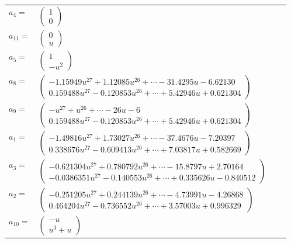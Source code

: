 \documentclass[1p]{elsarticle_modified}
\theoremstyle{definition}
\begin{document}
\begin{tabular}{m{7pt} m{180pt} m{7pt} m{180pt} }
\flushright $a_{4}=$&$\begin{pmatrix}1\\0\end{pmatrix}$ \\
\flushright $a_{11}=$&$\begin{pmatrix}0\\u\end{pmatrix}$ \\
\flushright $a_{5}=$&$\begin{pmatrix}1\\- u^2\end{pmatrix}$ \\
\flushright $a_{8}=$&$\begin{pmatrix}-1.15949 u^{27}+1.12085 u^{26}+\cdots-31.4295 u-6.62130\\0.159488 u^{27}-0.120853 u^{26}+\cdots+5.42946 u+0.621304\end{pmatrix}$ \\
\flushright $a_{9}=$&$\begin{pmatrix}- u^{27}+u^{26}+\cdots-26 u-6\\0.159488 u^{27}-0.120853 u^{26}+\cdots+5.42946 u+0.621304\end{pmatrix}$ \\
\flushright $a_{1}=$&$\begin{pmatrix}-1.49816 u^{27}+1.73027 u^{26}+\cdots-37.4676 u-7.20397\\0.338676 u^{27}-0.609413 u^{26}+\cdots+7.03817 u+0.582669\end{pmatrix}$ \\
\flushright $a_{3}=$&$\begin{pmatrix}-0.621304 u^{27}+0.780792 u^{26}+\cdots-15.8797 u+2.70164\\-0.0386351 u^{27}-0.140553 u^{26}+\cdots+0.335626 u-0.840512\end{pmatrix}$ \\
\flushright $a_{2}=$&$\begin{pmatrix}-0.251205 u^{27}+0.244139 u^{26}+\cdots-4.73991 u-4.26868\\0.464204 u^{27}-0.736552 u^{26}+\cdots+3.57003 u+0.996329\end{pmatrix}$ \\
\flushright $a_{10}=$&$\begin{pmatrix}- u\\u^3+u\end{pmatrix}$ \\

\end{tabular}
\end{document}
